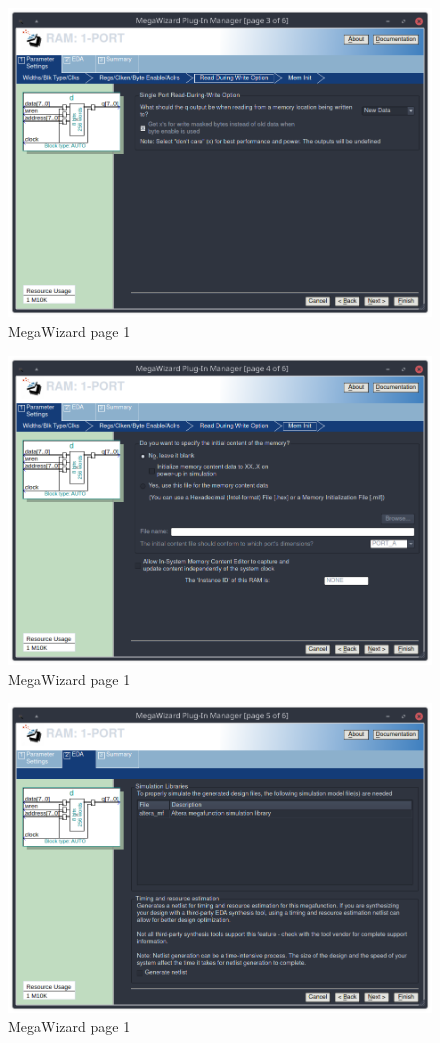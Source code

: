 \documentclass[letter,12pt]{article}
\begin{document}
\begin{figure}[H]
  \centering
  \includegraphics[width=.83\linewidth]{pics/Mega3.png}
  \caption{MegaWizard page 1}
\end{figure}
\begin{figure}[H]
  \centering
  \includegraphics[width=.83\linewidth]{pics/Mega4.png}
  \caption{MegaWizard page 1}
\end{figure}
\begin{figure}[H]
  \centering
  \includegraphics[width=.83\linewidth]{pics/Mega5.png}
  \caption{MegaWizard page 1}
\end{figure}
\end{document}
